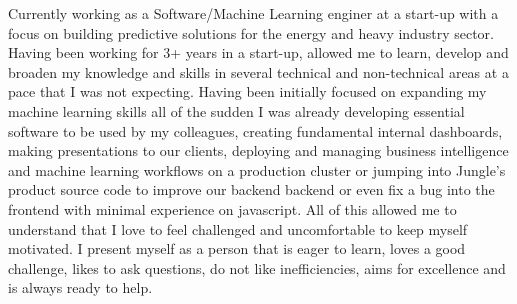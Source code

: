 

\begin{cvparagraph}

    Currently working as a Software/Machine Learning enginer at a start-up with a focus on building predictive solutions for the energy
    and heavy industry sector. Having been working for 3+ years in a start-up, allowed me to learn, develop and broaden my knowledge and skills in several technical and non-technical areas at a pace that I was not expecting. Having been initially focused on expanding my machine learning skills all of the sudden I was already developing essential software to be used by my colleagues, creating fundamental internal dashboards, making
    presentations to our clients,
    deploying and managing business intelligence and machine learning workflows on a production cluster or jumping into Jungle's product source code to improve our backend backend or even fix a bug into the frontend with minimal experience on javascript. All of this allowed me to understand that I love to feel challenged and uncomfortable to keep myself motivated. I present myself as a person that is eager to learn, loves a good challenge, likes to ask questions, do not like inefficiencies, aims for excellence and is always ready to help.
\end{cvparagraph}

